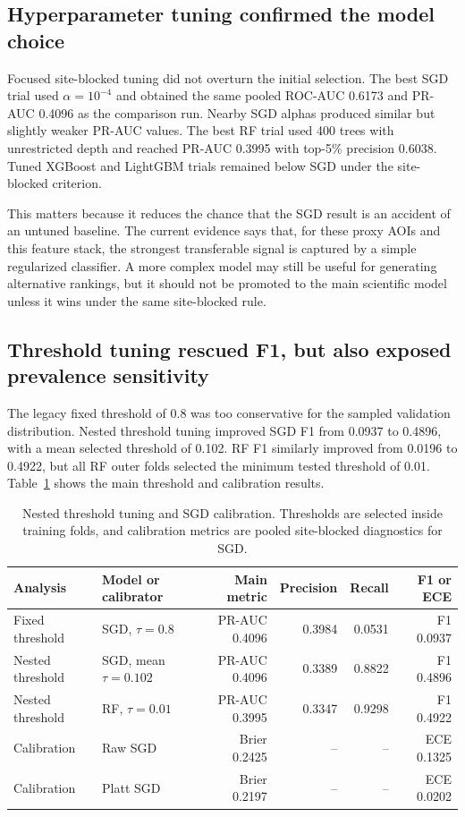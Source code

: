 \documentclass[numrefs]{interact}
\theoremstyle{plain}%
\theoremstyle{definition}
\theoremstyle{remark}
\begin{document}
\subsection{Hyperparameter tuning confirmed the model choice}
Focused site-blocked tuning did not overturn the initial selection. The best SGD trial used \(\alpha=10^{-4}\) and obtained the same pooled ROC-AUC 0.6173 and PR-AUC 0.4096 as the comparison run. Nearby SGD alphas produced similar but slightly weaker PR-AUC values. The best RF trial used 400 trees with unrestricted depth and reached PR-AUC 0.3995 with top-5\% precision 0.6038. Tuned XGBoost and LightGBM trials remained below SGD under the site-blocked criterion.

This matters because it reduces the chance that the SGD result is an accident of an untuned baseline. The current evidence says that, for these proxy AOIs and this feature stack, the strongest transferable signal is captured by a simple regularized classifier. A more complex model may still be useful for generating alternative rankings, but it should not be promoted to the main scientific model unless it wins under the same site-blocked rule.

\subsection{Threshold tuning rescued F1, but also exposed prevalence sensitivity}
The legacy fixed threshold of 0.8 was too conservative for the sampled validation distribution. Nested threshold tuning improved SGD F1 from 0.0937 to 0.4896, with a mean selected threshold of 0.102. RF F1 similarly improved from 0.0196 to 0.4922, but all RF outer folds selected the minimum tested threshold of 0.01. Table~\ref{tab:threshold-calibration} shows the main threshold and calibration results.

\begin{table}[t]
\centering
\caption{Nested threshold tuning and SGD calibration. Thresholds are selected inside training folds, and calibration metrics are pooled site-blocked diagnostics for SGD.}
\label{tab:threshold-calibration}
\begin{tabular}{llrrrr}
\toprule
Analysis & Model or calibrator & Main metric & Precision & Recall & F1 or ECE \\
\midrule
Fixed threshold & SGD, \(\tau=0.8\) & PR-AUC 0.4096 & 0.3984 & 0.0531 & F1 0.0937 \\
Nested threshold & SGD, mean \(\tau=0.102\) & PR-AUC 0.4096 & 0.3389 & 0.8822 & F1 0.4896 \\
Nested threshold & RF, \(\tau=0.01\) & PR-AUC 0.3995 & 0.3347 & 0.9298 & F1 0.4922 \\
Calibration & Raw SGD & Brier 0.2425 & -- & -- & ECE 0.1325 \\
Calibration & Platt SGD & Brier 0.2197 & -- & -- & ECE 0.0202 \\
\bottomrule
\end{tabular}
\end{table}
\end{document}

